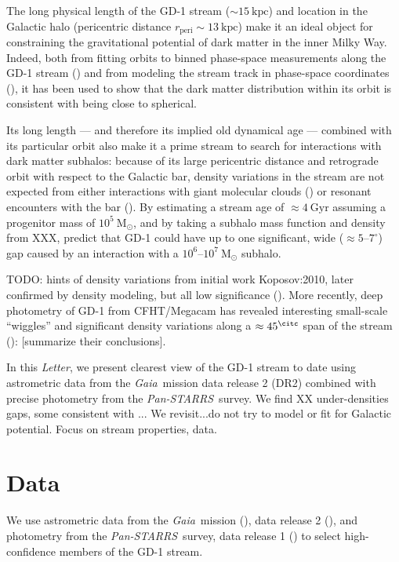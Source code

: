 \documentclass[modern]{aastex62}
\newcommand{\acronym}[1]{{\small{#1}}}
\newcommand{\gaia}{\textsl{Gaia}}
\newcommand{\pans}{\textsl{Pan-STARRS}}
\newcommand{\DR}{\acronym{DR2}}
\newcommand{\msun}{\textrm{M}_\odot}
\newcommand{\kpc}{\textrm{kpc}}
\newcommand{\article}{\textsl{Letter}}
\newcommand{\todo}[1]{{\color{red} TODO: #1}}
\begin{document}
The long physical length of the GD-1 stream ($\sim 15~\kpc$) and location in the
Galactic halo (pericentric distance $r_\textrm{peri} \sim 13~\kpc$) make it an
ideal object for constraining the gravitational potential of dark matter in the
inner Milky Way.
Indeed, both from fitting orbits to binned phase-space measurements along the
GD-1 stream (\citealt{Koposov:2010}) and from modeling the stream track in
phase-space coordinates (\citealt{Bovy:2016}), it has been used to show that the
dark matter distribution within its orbit is consistent with being close to
spherical.

Its long length --- and therefore its implied old dynamical age --- combined
with its particular orbit also make it a prime stream to search for interactions
with dark matter subhalos:
because of its large pericentric distance and retrograde orbit with respect to
the Galactic bar, density variations in the stream are not expected from either
interactions with giant molecular clouds (\citealt{Amorisco:2016}) or resonant
encounters with the bar (\citealt{Pearson:2017}).
By estimating a stream age of $\approx 4~\textrm{Gyr}$ assuming a progenitor
mass of $10^5~\msun$, and by taking a subhalo mass function and density from
XXX, \citet{Erkal:2016} predict that GD-1 could have up to one significant, wide
($\approx 5$--$7^\circ$) gap caused by an interaction with a
$10^6$--$10^7~\msun$ subhalo.

\todo{hints of density variations} from initial work Koposov:2010, later confirmed by density modeling, but all low significance
(\citealt{Carlberg:2013}).
More recently, deep photometry of GD-1 from CFHT/Megacam has revealed
interesting small-scale ``wiggles'' and significant density variations along a $\approx 45^\citc$ span of the stream (\citealt{DeBoer:2017}):
[summarize their conclusions].

In this \article, we present clearest view of the GD-1 stream to date using
astrometric data from the \gaia\ mission data release 2 (\DR) combined with
precise photometry from the \pans\ survey.
We find XX under-densities gaps, some consistent with ...
We revisit...do not try to model or fit for Galactic potential.
Focus on stream properties, data.


\section{Data}
\label{sec:data}

We use astrometric data from the \gaia\ mission (\citealt{Prusti:2016}), data
release 2 (\citealt{Gaia-Collaboration:2018, Lindegren:2018}), and photometry
from the \pans\ survey, data release 1 (\citealt{Chambers:2016}) to select
high-confidence members of the GD-1 stream.
\end{document}
